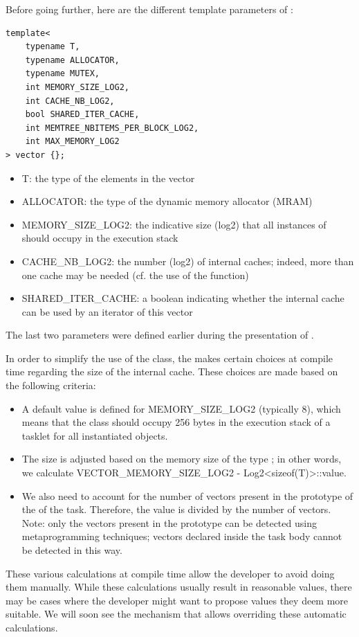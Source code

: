 Before going further, here are the different template parameters of :
\begin{verbatim}
template<
    typename T,
    typename ALLOCATOR,
    typename MUTEX,
    int MEMORY_SIZE_LOG2,
    int CACHE_NB_LOG2,
    bool SHARED_ITER_CACHE,
    int MEMTREE_NBITEMS_PER_BLOCK_LOG2,
    int MAX_MEMORY_LOG2
> vector {};
\end{verbatim}
\begin{itemize}
\item T: the type of the elements in the vector
\item ALLOCATOR: the type of the dynamic memory allocator (MRAM)
\item MEMORY\_SIZE\_LOG2: the indicative size (log2) that all instances of  should occupy in the execution stack
\item CACHE\_NB\_LOG2: the number (log2) of internal caches; indeed, more than one cache may be needed 
(cf. the use of the  function)
\item SHARED\_ITER\_CACHE: a boolean indicating whether the internal cache can be used by an iterator of this vector
\end{itemize}
The last two parameters were defined earlier during the presentation of .

In order to simplify the use of the  class, the \BPL makes certain choices at compile time
 regarding the size of the internal cache. These choices are made based on the following criteria:
 \begin{itemize}
\item A default value is defined for MEMORY\_SIZE\_LOG2 (typically 8), which means that the  class should occupy 256 bytes 
in the execution stack of a tasklet for all instantiated objects.
\item The size is adjusted based on the memory size of the type ; in other words, we calculate
VECTOR\_MEMORY\_SIZE\_LOG2 - Log2\textless sizeof(T)\textgreater::value.
\item We also need to account for the number of vectors present in the prototype of the  of the task. 
Therefore, the value is divided by the number of vectors. Note: only the vectors present in the prototype can be 
detected using metaprogramming techniques; vectors declared inside the task body cannot be detected in this way.
\end{itemize}
These various calculations at compile time allow the developer to avoid doing them manually. 
While these calculations usually result in reasonable values, there may be cases where the developer might want 
to propose values they deem more suitable. We will soon see the mechanism that allows overriding these automatic calculations.

